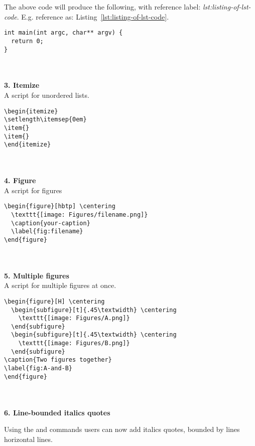 The above code will produce the following, with reference label: \textit{lst:listing-of-lst-code}. E.g. reference as: Listing~\ref{lst:listing-of-lst-code}.
\lstset{language=c}
\lstset{basicstyle=\footnotesize\ttfamily}
\begin{lstlisting}[caption={This is a listing of C code with caption at the top.},captionpos=t,label={lst:listing-of-lst-code}]
int main(int argc, char** argv) {
  return 0;
}
\end{lstlisting}
~\\ \\ %
\textbf{3. Itemize} \\
A script for unordered lists.
\lstset{language=tex}
\lstset{basicstyle=\small\ttfamily}
\begin{lstlisting}
\begin{itemize}
\setlength\itemsep{0em}
\item{}
\item{}
\end{itemize}
\end{lstlisting}
~\\ \\ %
\newpage
\textbf{4. Figure} \\
A script for figures
\begin{lstlisting}
\begin{figure}[hbtp] \centering
  \texttt{[image: Figures/filename.png]}
  \caption{your-caption}
  \label{fig:filename}
\end{figure}
\end{lstlisting}
~\\ \\ %
\textbf{5. Multiple figures} \\
A script for multiple figures at once.
\begin{lstlisting}
\begin{figure}[H] \centering
  \begin{subfigure}[t]{.45\textwidth} \centering
    \texttt{[image: Figures/A.png]}
  \end{subfigure}
  \begin{subfigure}[t]{.45\textwidth} \centering
    \texttt{[image: Figures/B.png]}
  \end{subfigure}
\caption{Two figures together}
\label{fig:A-and-B}
\end{figure}
\end{lstlisting}
~\\ \\ %
\textbf{6. Line-bounded italics quotes} \\
\begin{itquote}
Using the  and  commands users can now add italics quotes, bounded by lines horizontal lines.
\end{itquote}
